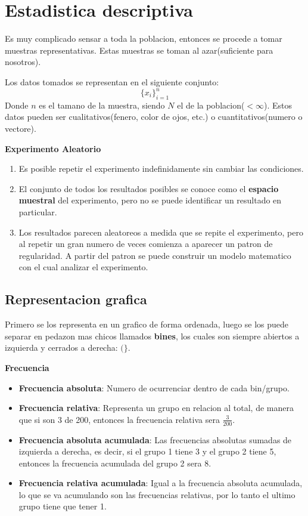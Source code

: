 

\section{Estadistica  descriptiva}

Es muy complicado sensar a toda la poblacion, entonces se procede a tomar muestras representativas. Estas muestras se toman al azar(suficiente para nosotros).

Los datos tomados se representan en el siguiente conjunto:
\[
	\{x_i\}^n_{i=1}
\]
Donde $n$ es el tamano de la muestra, siendo $N$ el de la poblacion($ < \infty$). Estos datos pueden ser cualitativos(fenero, color de ojos, etc.) o cuantitativos(numero o vectore).

\begin{definition}
	\textbf{Experimento Aleatorio}
	\begin{enumerate}
		\item Es posible repetir el experimento indefinidamente sin cambiar las condiciones.
		\item El conjunto de todos los resultados posibles se conoce como el \textbf{espacio muestral} del experimento, pero no se puede
			identificar un resultado en particular.
		\item Los resultados parecen aleatoreos a medida que se repite el experimento, pero al repetir un gran numero de veces comienza a aparecer
			un patron de regularidad. A partir del patron se puede construir un modelo matematico con el cual analizar el experimento.
	\end{enumerate}
\end{definition}

\subsection{Representacion grafica}
Primero se los representa en un grafico de forma ordenada, luego se los puede separar en pedazon mas chicos llamados \textbf{bines}, los cuales son siempre abiertos a izquierda y cerrados a derecha: $(\}$.

\begin{definition}
	\textbf{Frecuencia}
	\begin{itemize}
		\item \textbf{Frecuencia absoluta}: Numero de ocurrenciar dentro de cada bin/grupo.
		\item \textbf{Frecuencia relativa}: Representa un grupo en relacion al total, de manera que si son 3 de 200, entonces la frecuencia relativa sera $\frac{3}{200}$.
		\item \textbf{Frecuencia absoluta acumulada}: Las frecuencias absolutas sumadas de izquierda a derecha, es decir, si el grupo 1 tiene 3 y el grupo 2 tiene 5, entonces la frecuencia acumulada del grupo 2 sera 8.
	\item \textbf{Frecuencia relativa acumulada}: Igual a la frecuencia absoluta acumulada, lo que se va acumulando son las frecuencias relativas, por lo tanto el ultimo grupo tiene que tener 1. 
\end{itemize}
\end{definition}


